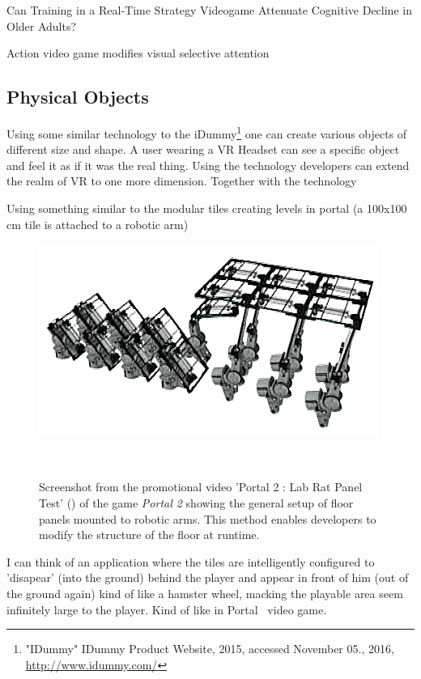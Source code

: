 Can Training in a Real-Time Strategy Videogame Attenuate Cognitive Decline in Older Adults?

Action video game modifies visual selective attention

\subsection{Physical Objects}

Using some similar technology to the iDummy\footnote{"IDummy" IDummy Product Website, 2015, accessed November 05., 2016, \url{http://www.idummy.com/}} one can create various objects of different size and shape. A user wearing a VR Headset can see a specific object and feel it as if it was the real thing. Using the technology developers can extend the realm of VR to one more dimension. Together with the technology~\cite{Azmandian:2016:HRD:2858036.2858226}

Using something similar to the modular tiles creating levels in portal (a 100x100 cm tile is attached to a robotic arm)

\begin{figure}
	\centering
	\includegraphics[width=0.9\columnwidth]{./figures/portallabrattest}
	\caption[Portal 2 : Lab Rat Panel Test]{Screenshot from the promotional video 'Portal 2 : Lab Rat Panel Test' (\ccbyncsa) of the game \textit{Portal 2 \textregistered\textcopyright} showing the general setup of floor panels mounted to robotic arms. This method enables developers to modify the structure of the floor at runtime.\footnotemark}~\label{fig:portallabrattest}
\end{figure}

I can think of an application where the tiles are intelligently configured to 'disapear' (into the ground) behind the player and appear in front of him (out of the ground again) kind of like a hamster wheel, macking the playable area seem infinitely large to the player. Kind of like in Portal~\cite{game:portal} video game.

